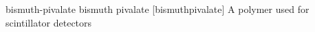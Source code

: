 \newglsXchemical%
{bismuth-pivalate}%
{bismuth pivalate}%
{}%
[bismuthpivalate]%
{A polymer used for scintillator detectors}%